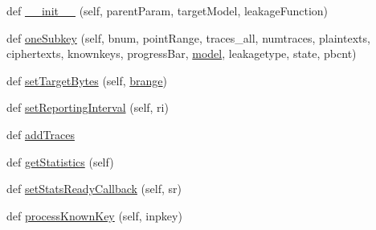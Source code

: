 \begin{DoxyCompactItemize}
\item 
def \hyperlink{classsoftware_1_1chipwhisperer_1_1analyzer_1_1attacks_1_1cpa__algorithms_1_1simpleloop_1_1CPASimpleLoop_a57c7031af55adc9789d673cb0026558e}{\+\_\+\+\_\+init\+\_\+\+\_\+} (self, parent\+Param, target\+Model, leakage\+Function)
\item 
def \hyperlink{classsoftware_1_1chipwhisperer_1_1analyzer_1_1attacks_1_1cpa__algorithms_1_1simpleloop_1_1CPASimpleLoop_ad71ff1f2f64fa90b9d52c61b3b2dd3a3}{one\+Subkey} (self, bnum, point\+Range, traces\+\_\+all, numtraces, plaintexts, ciphertexts, knownkeys, progress\+Bar, \hyperlink{classsoftware_1_1chipwhisperer_1_1analyzer_1_1attacks_1_1cpa__algorithms_1_1simpleloop_1_1CPASimpleLoop_a450751e7ecb40c5131d3ccf548ccddcb}{model}, leakagetype, state, pbcnt)
\item 
def \hyperlink{classsoftware_1_1chipwhisperer_1_1analyzer_1_1attacks_1_1cpa__algorithms_1_1simpleloop_1_1CPASimpleLoop_aa1dd79274216d7b9a61dad573dd2f4ce}{set\+Target\+Bytes} (self, \hyperlink{classsoftware_1_1chipwhisperer_1_1analyzer_1_1attacks_1_1cpa__algorithms_1_1simpleloop_1_1CPASimpleLoop_adcb6a59548d927dba0feb6d0d84445e1}{brange})
\item 
def \hyperlink{classsoftware_1_1chipwhisperer_1_1analyzer_1_1attacks_1_1cpa__algorithms_1_1simpleloop_1_1CPASimpleLoop_a2bddfd0c9da8aec6c906b7fe48097b05}{set\+Reporting\+Interval} (self, ri)
\item 
def \hyperlink{classsoftware_1_1chipwhisperer_1_1analyzer_1_1attacks_1_1cpa__algorithms_1_1simpleloop_1_1CPASimpleLoop_a812997591539f1212aa55ab2619a0b41}{add\+Traces}
\item 
def \hyperlink{classsoftware_1_1chipwhisperer_1_1analyzer_1_1attacks_1_1cpa__algorithms_1_1simpleloop_1_1CPASimpleLoop_a6f6a3c993c4138a8fb6392e5578a8164}{get\+Statistics} (self)
\item 
def \hyperlink{classsoftware_1_1chipwhisperer_1_1analyzer_1_1attacks_1_1cpa__algorithms_1_1simpleloop_1_1CPASimpleLoop_a356349e3a310199e916d8dc854a3e47f}{set\+Stats\+Ready\+Callback} (self, sr)
\item 
def \hyperlink{classsoftware_1_1chipwhisperer_1_1analyzer_1_1attacks_1_1cpa__algorithms_1_1simpleloop_1_1CPASimpleLoop_aedd7c5bd9446d7ee8da302dbf1c43b74}{process\+Known\+Key} (self, inpkey)
\end{DoxyCompactItemize}
